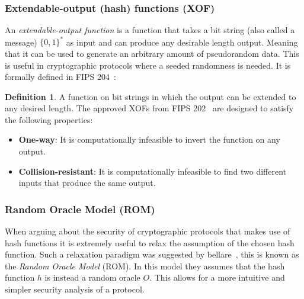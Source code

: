 \documentclass[11pt]{report}
\theoremstyle{definition}
\newtheorem{definition}{Definition}[section]
\theoremstyle{plain}
\begin{document}
\subsubsection{Extendable-output (hash) functions (XOF)}\label{sec:xof}
An \textit{extendable-output function} is a function that takes a bit string (also called a message) $\{0,1\}^*$ as input and can produce any desirable length output. Meaning that it can be used to generate an arbitrary amount of pseudorandom data. This is useful in cryptographic protocols where a seeded randomness is needed.
It is formally defined in FIPS 204~\cite{FIPS204_2024}:
\begin{definition}
  A function on bit strings in which the output can be extended to any desired length. The approved XOFs from FIPS 202~\cite{FIPS202_2015} are designed to satisfy the following properties:
  \begin{itemize}
    \item \textbf{One-way}: It is computationally infeasible to invert the function on any output.
    \item \textbf{Collision-resistant}: It is computationally infeasible to find two different inputs that produce the same output.
  \end{itemize}
\end{definition}

\subsubsection{Random Oracle Model (ROM)}

When arguing about the security of cryptographic protocols that makes use of hash functions it is extremely useful to relax the assumption of the chosen hash function.
Such a relaxation paradigm was suggested by bellare~\cite{bellare1993random}, this is known as the \textit{Random Oracle Model} (ROM). In this model they assumes that the hash function $h$ is instead a random oracle $O$. This allows for a more intuitive and simpler security analysis of a protocol.
\end{document}
